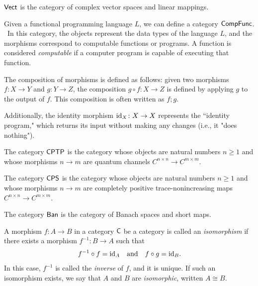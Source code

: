 \begin{example}
 $\mathsf{Vect}$ is the category of complex vector spaces and linear mappings.
\end{example}

\begin{example}
Given a functional programming language $L$, we can define a category $\mathsf{CompFunc}$.  In this category, the objects represent the data types of the language \( L \), and the morphisms correspond to computable functions or programs. A function is considered \emph{computable} if a computer program is capable of executing that function.

The composition of morphisms is defined as follows: given two morphisms \( f \colon X \to Y \) and \( g \colon Y \to Z \), the composition \( g \circ f \colon X \to Z \) is defined by applying \( g \) to the output of \( f \). This composition is often written as \( f;g \).

Additionally, the identity morphism \( \mathrm{id}_X \colon X \to X \) represents the ``identity program," which returns its input without making any changes (i.e., it "does nothing").
\end{example}

\begin{example}
The category $\mathsf{CPTP}$ is the category whose objects are natural numbers $n \geq 1$ and whose morphisms $n \rightarrow m$ are quantum channels $C^{n \times n} \rightarrow C^{m\times m}$.
\end{example}

\begin{example}
The category $\mathsf{CPS}$ is the category whose objects are natural numbers $n \geq 1$ and whose morphisms $n \rightarrow m$ are completely positive trace-nonincreasing maps $C^{n \times n} \rightarrow C^{m\times m}$.
\end{example}

\begin{example}
  The category $\mathsf{Ban}$ is the category of Banach spaces and short maps.
\end{example}


\begin{definition} 
 A morphism $f : A \to B$  in a category $\mathsf{C}$ be a category is called an \emph{isomorphism} if there exists a morphism $f^{-1} : B \to A$ such that
\[
f^{-1} \circ f = \mathrm{id}_A \quad \text{and} \quad f \circ g = \mathrm{id}_B.
\]
In this case, $f^{-1}$ is called the \emph{inverse} of $f$, and it is unique. If such an isomorphism exists, we say that $A$ and $B$ are \emph{isomorphic}, written
$A \cong B.$
\end{definition}

